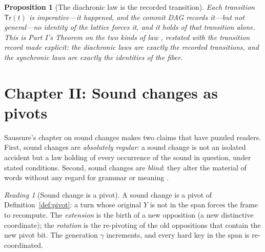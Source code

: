 \documentclass[11pt,a4paper]{article}
\newtheorem{proposition}[principle]{Proposition}
\theoremstyle{remark}
\newtheorem{reading}[principle]{Reading}
\newcommand{\Gen}{\ensuremath{\gamma}}                   %
\newcommand{\Trans}{\ensuremath{\mathsf{Tr}}}            %
\begin{document}
\begin{proposition}[The diachronic law is the recorded transition]
\label{prop:dia-law}
Each transition $\Trans(t)$ is \emph{imperative}---it happened, and the commit
DAG records it---but \emph{not general}---no identity of the lattice forces
it, and it holds of that transition alone. This is Part I's Theorem on the
two kinds of law \cite{part1}, restated with the transition record made
explicit: the diachronic laws are exactly the recorded transitions, and the
synchronic laws are exactly the identities of the fiber.
\end{proposition}

\section{Chapter II: Sound changes as pivots}
\label{sec:ch2}

Saussure's chapter on sound changes makes two claims that have puzzled
readers. First, sound changes are \emph{absolutely regular}: a sound change
is not an isolated accident but a law holding of every occurrence of the
sound in question, under stated conditions. Second, sound changes are
\emph{blind}: they alter the material of words without any regard for grammar
or meaning \cite[Part III, ch.~II]{harris1983}.

\begin{reading}[Sound change is a pivot]
\label{read:sound}
A sound change is a pivot of Definition~\ref{def:pivot}: a turn whose
original $Y$ is not in the span forces the frame to recompute. The
\emph{extension} is the birth of a new opposition (a new distinctive
coordinate); the \emph{rotation} is the re-pivoting of the old oppositions
that contain the new pivot bit. The generation $\Gen$ increments, and every
hard key in the span is re-coordinated.
\end{reading}
\end{document}
